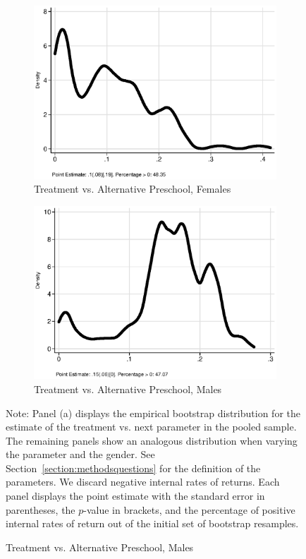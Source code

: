 \begin{figure}
\begin{subfigure}[h]{0.25\textwidth}
\end{subfigure}%
\begin{subfigure}[h]{0.25\textwidth}
	\centering
	\caption{Treatment vs. Alternative Preschool, Females}
		\includegraphics[width=\textwidth]{output/irr_8_sexf.eps}
\end{subfigure}%
\begin{subfigure}[h]{0.25\textwidth}
	\centering
	\caption{Treatment vs. Alternative Preschool, Males}
		\includegraphics[width=\textwidth]{output/irr_8_sexm.eps}
\end{subfigure}
\footnotesize \justify
Note: Panel (a) displays the empirical bootstrap distribution for the estimate of the treatment vs. next parameter in the pooled sample. The remaining panels show an analogous distribution when varying the parameter and the gender. See Section~\ref{section:methodsquestions} for the definition of the parameters. We discard negative internal rates of returns. Each panel displays the point estimate with the standard error in parentheses, the $p$-value in brackets, and the percentage of positive internal rates of return out of the initial set of bootstrap resamples.
\end{figure}
\restoregeometry
\doublespacing




